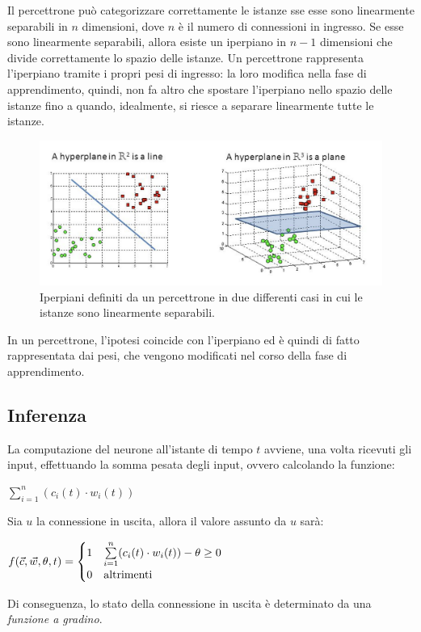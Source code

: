Il percettrone può categorizzare correttamente le istanze sse esse sono
linearmente separabili in $n$ dimensioni, dove $n$ è il numero di connessioni in
ingresso. Se esse sono linearmente separabili, allora esiste un iperpiano in
$n-1$ dimensioni che divide correttamente lo spazio delle istanze.
Un percettrone rappresenta l'iperpiano tramite i propri  pesi di ingresso: la
loro modifica nella fase di apprendimento, quindi, non fa altro che spostare
l'iperpiano nello spazio delle istanze fino a quando, idealmente, si riesce a
separare linearmente tutte le istanze.
\begin{figure}[ht]
    \centering
    \includegraphics[width=1\linewidth]{img/hyperplane_perceptron.png}
    \caption{Iperpiani definiti da un percettrone in due differenti casi in cui
    le istanze sono linearmente separabili.}
    \label{fig:hyperplane_perceptron}
\end{figure}
In un percettrone, l'ipotesi coincide con l'iperpiano ed è quindi di fatto
rappresentata dai pesi, che vengono modificati nel corso della fase di
apprendimento.

\subsection{Inferenza}
La computazione del neurone all'istante di tempo $t$ avviene, una volta ricevuti
gli input, effettuando la somma pesata degli input, ovvero calcolando la
funzione:
\begin{center}
    $\sum\limits_{i = 1}^{n} (c_i(t) \cdot w_i(t))$
\end{center}
Sia $u$ la connessione in uscita, allora il valore assunto da $u$ sarà:
\begin{center}
    $f(\Vec{c}, \Vec{w}, \theta, t) = \begin{cases}
        1 & \sum\limits_{i = 1}^{n} (c_i(t) \cdot w_i(t)) - \theta \ge 0 \\
        0 & \textnormal{altrimenti}
    \end{cases}$
\end{center}
Di conseguenza, lo stato della connessione in uscita è determinato da una
\textit{funzione a gradino}.

